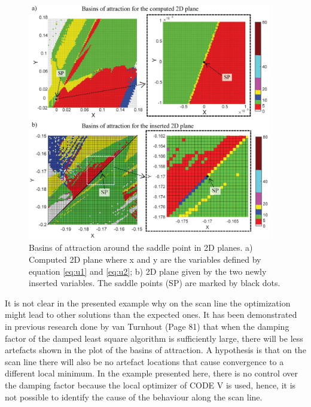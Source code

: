 \begin{figure}[h!]
    \centering
    \includegraphics[width=0.95\textwidth]{chapter-4/figures/Basins_two_situations.png}
    \caption{Basins of attraction around the saddle point in 2D planes. a) Computed 2D plane where x and y are the variables defined by equation \ref{eq:u1} and \ref{eq:u2}; b) 2D plane given by the two newly inserted variables. The saddle points (SP) are marked by black dots.}
    \label{fig:basins}
\end{figure}

\newpage
It is not clear in the presented example why on the scan line the optimization might lead to other solutions than the expected ones. It has been demonstrated in previous research done by van Turnhout \cite{vanTurnhoutThesis2009} (Page 81)\cite{vanTurnhout2009_landscape_instab} that when the damping factor of the damped least square algorithm is sufficiently large, there will be less artefacts shown in the plot of the basins of attraction. A hypothesis is that on the scan line there will also be no artefact locations that cause convergence to a different local minimum. In the example presented here, there is no control over the damping factor because the local optimizer of CODE V is used, hence, it is not possible to identify the cause of the behaviour along the scan line. 

